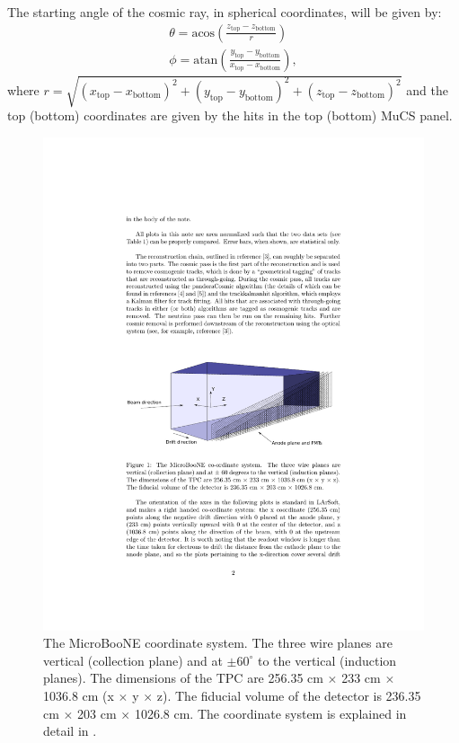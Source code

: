 \documentclass[a4paper]{scrartcl}
\begin{document}
The starting angle of the cosmic ray, in spherical coordinates, will be given by:
\begin{align}
  \theta = \mathrm{acos}\left(\frac{z_{\mathrm{top}}-z_{\mathrm{bottom}}}{r}\right) \\
  \phi = \mathrm{atan}\left(\frac{y_{\mathrm{top}}-y_{\mathrm{bottom}}}{x_{\mathrm{top}}-x_{\mathrm{bottom}}}\right),
\end{align}
where $r = \sqrt{(x_{\mathrm{top}}-x_{\mathrm{bottom}})^2+(y_{\mathrm{top}}-y_{\mathrm{bottom}})^2+(z_{\mathrm{top}}-z_{\mathrm{bottom}})^2}$ and the top (bottom) coordinates are given by the hits in the top (bottom) MuCS panel.
\begin{figure}[htbp]
  \begin{center}
    \includegraphics[width=0.8\linewidth]{figures/coord.pdf}

    \caption{The MicroBooNE coordinate system. The three wire planes are vertical (collection plane) and at  $\pm60^{\circ}$ to the vertical (induction planes). The dimensions of the TPC are 256.35 cm $\times$ 233 cm $\times$ 1036.8 cm (x $\times$ y $\times$ z). The fiducial volume of the detector is 236.35 cm $\times$ 203 cm $\times$ 1026.8 cm. The coordinate system is explained in detail in \cite{mcdata}.} \label{fig:coord}
  \end{center}
\end{figure}
\end{document}
